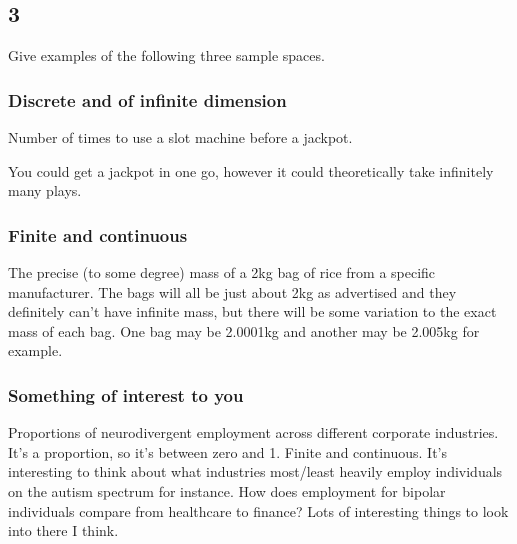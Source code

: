 \subsection*{3}

Give examples of the following three sample spaces.

\subsubsection*{Discrete and of infinite dimension}

Number of times to use a slot machine before a jackpot.

You could get a jackpot in one go, however it could theoretically take infinitely many plays. 

\subsubsection*{Finite and continuous}

The precise (to some degree) mass of a 2kg bag of rice from a specific manufacturer. The bags will all be just about 2kg as advertised and they definitely can't have infinite mass, but there will be some variation to the exact mass of each bag. One bag may be 2.0001kg and another may be 2.005kg for example. 

\subsubsection*{Something of interest to you}

Proportions of neurodivergent employment across different corporate industries. It's a proportion, so it's between zero and 1. Finite and continuous. It's interesting to think about what industries most/least heavily employ individuals on the autism spectrum for instance. How does employment for bipolar individuals compare from healthcare to finance? Lots of interesting things to look into there I think.
